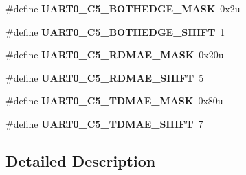 \begin{DoxyCompactItemize}
\item 
\hypertarget{group___u_a_r_t0___register___masks_gaa34159b3052095ce96fa50cc6183de77}{}\#define {\bfseries U\+A\+R\+T0\+\_\+\+C5\+\_\+\+B\+O\+T\+H\+E\+D\+G\+E\+\_\+\+M\+A\+S\+K}~0x2u\label{group___u_a_r_t0___register___masks_gaa34159b3052095ce96fa50cc6183de77}

\item 
\hypertarget{group___u_a_r_t0___register___masks_ga7d1df71b9671df4f50ecb6c1e1518731}{}\#define {\bfseries U\+A\+R\+T0\+\_\+\+C5\+\_\+\+B\+O\+T\+H\+E\+D\+G\+E\+\_\+\+S\+H\+I\+F\+T}~1\label{group___u_a_r_t0___register___masks_ga7d1df71b9671df4f50ecb6c1e1518731}

\item 
\hypertarget{group___u_a_r_t0___register___masks_ga75704957ea817d0ea4ef69975008dae1}{}\#define {\bfseries U\+A\+R\+T0\+\_\+\+C5\+\_\+\+R\+D\+M\+A\+E\+\_\+\+M\+A\+S\+K}~0x20u\label{group___u_a_r_t0___register___masks_ga75704957ea817d0ea4ef69975008dae1}

\item 
\hypertarget{group___u_a_r_t0___register___masks_ga5074684d000e97fb534e7e1dc22ea172}{}\#define {\bfseries U\+A\+R\+T0\+\_\+\+C5\+\_\+\+R\+D\+M\+A\+E\+\_\+\+S\+H\+I\+F\+T}~5\label{group___u_a_r_t0___register___masks_ga5074684d000e97fb534e7e1dc22ea172}

\item 
\hypertarget{group___u_a_r_t0___register___masks_ga02899afc667f46e4beecd75e31b0fa90}{}\#define {\bfseries U\+A\+R\+T0\+\_\+\+C5\+\_\+\+T\+D\+M\+A\+E\+\_\+\+M\+A\+S\+K}~0x80u\label{group___u_a_r_t0___register___masks_ga02899afc667f46e4beecd75e31b0fa90}

\item 
\hypertarget{group___u_a_r_t0___register___masks_ga932dfb6ee4de4ff77a7a7d3154718286}{}\#define {\bfseries U\+A\+R\+T0\+\_\+\+C5\+\_\+\+T\+D\+M\+A\+E\+\_\+\+S\+H\+I\+F\+T}~7\label{group___u_a_r_t0___register___masks_ga932dfb6ee4de4ff77a7a7d3154718286}

\end{DoxyCompactItemize}


\subsection{Detailed Description}
